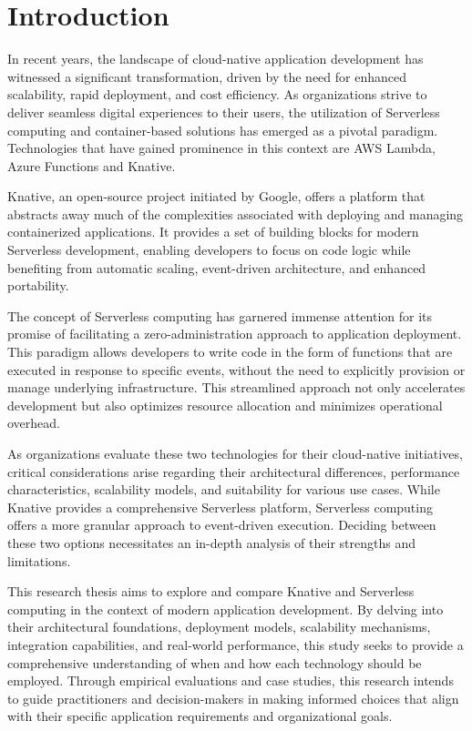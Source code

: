 \documentclass{article}
\begin{document}
\section{Introduction}
\begin{flushleft} 
In recent years, the landscape of cloud-native application development has witnessed a significant transformation, driven by the need for enhanced scalability, rapid deployment, and cost efficiency. As organizations strive to deliver seamless digital experiences to their users, the utilization of Serverless computing and container-based solutions has emerged as a pivotal paradigm. Technologies that have gained prominence in this context are \gls{AWS} Lambda, Azure Functions and Knative.

Knative, an open-source project initiated by Google, offers a platform that abstracts away much of the complexities associated with deploying and managing containerized applications. It provides a set of building blocks for modern Serverless development, enabling developers to focus on code logic while benefiting from automatic scaling, event-driven architecture, and enhanced portability.

The concept of Serverless computing has garnered immense attention for its promise of facilitating a zero-administration approach to application deployment. This paradigm allows developers to write code in the form of functions that are executed in response to specific events, without the need to explicitly provision or manage underlying infrastructure. This streamlined approach not only accelerates development but also optimizes resource allocation and minimizes operational overhead.

As organizations evaluate these two technologies for their cloud-native initiatives, critical considerations arise regarding their architectural differences, performance characteristics, scalability models, and suitability for various use cases. While Knative provides a comprehensive Serverless platform, Serverless computing offers a more granular approach to event-driven execution. Deciding between these two options necessitates an in-depth analysis of their strengths and limitations.

This research thesis aims to explore and compare Knative and Serverless computing in the context of modern application development. By delving into their architectural foundations, deployment models, scalability mechanisms, integration capabilities, and real-world performance, this study seeks to provide a comprehensive understanding of when and how each technology should be employed. Through empirical evaluations and case studies, this research intends to guide practitioners and decision-makers in making informed choices that align with their specific application requirements and organizational goals.


\end{flushleft}
\end{document}
